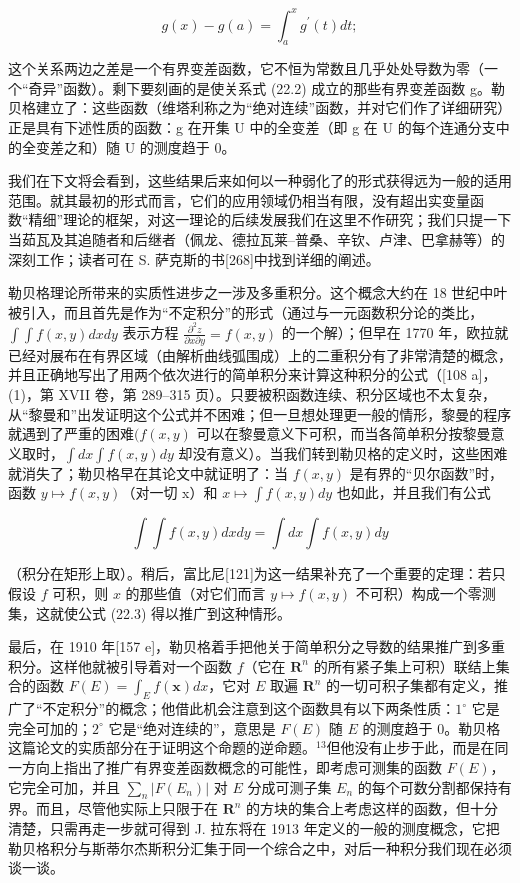 \[
g (x) - g (a) = \int_ {a} ^ {x} g ^ {\prime} (t) d t;\tag{22.2}
\]

这个关系两边之差是一个有界变差函数，它不恒为常数且几乎处处导数为零（一个“奇异”函数）。剩下要刻画的是使关系式 (22.2) 成立的那些有界变差函数 g。勒贝格建立了：这些函数（维塔利称之为“绝对连续”函数，并对它们作了详细研究）正是具有下述性质的函数：g 在开集 U 中的全变差（即 g 在 U 的每个连通分支中的全变差之和）随 U 的测度趋于 0。

我们在下文将会看到，这些结果后来如何以一种弱化了的形式获得远为一般的适用范围。就其最初的形式而言，它们的应用领域仍相当有限，没有超出实变量函数“精细”理论的框架，对这一理论的后续发展我们在这里不作研究；我们只提一下当茹瓦及其追随者和后继者（佩龙、德拉瓦莱–普桑、辛钦、卢津、巴拿赫等）的深刻工作；读者可在 S. 萨克斯的书{[}268{]}中找到详细的阐述。

勒贝格理论所带来的实质性进步之一涉及多重积分。这个概念大约在 18 世纪中叶被引入，而且首先是作为“不定积分”的形式（通过与一元函数积分论的类比，\(\int\int f(x,y)dx dy\) 表示方程 \(\frac{\partial^{2}z}{\partial x\partial y}=f(x,y)\) 的一个解）；但早在 1770 年，欧拉就已经对展布在有界区域（由解析曲线弧围成）上的二重积分有了非常清楚的概念，并且正确地写出了用两个依次进行的简单积分来计算这种积分的公式（{[}108 a{]}，(1)，第 XVII 卷，第 289–315 页）。只要被积函数连续、积分区域也不太复杂，从“黎曼和”出发证明这个公式并不困难；但一旦想处理更一般的情形，黎曼的程序就遇到了严重的困难\((f(x,y)\) 可以在黎曼意义下可积，而当各简单积分按黎曼意义取时，\(\int dx\int f(x,y)dy\) 却没有意义）。当我们转到勒贝格的定义时，这些困难就消失了；勒贝格早在其论文中就证明了：当 \(f(x,y)\) 是有界的“贝尔函数”时，函数 \(y\mapsto f(x,y)\)（对一切 x）和 \(x\mapsto\int f(x,y)dy\) 也如此，并且我们有公式

\[
\int \int f (x, y) d x d y = \int d x \int f (x, y) d y\tag{22.3}
\]

（积分在矩形上取）。稍后，富比尼{[}121{]}为这一结果补充了一个重要的定理：若只假设 \(f\) 可积，则 \(x\) 的那些值（对它们而言 \(y \mapsto f(x, y)\) 不可积）构成一个零测集，这就使公式 (22.3) 得以推广到这种情形。

最后，在 1910 年{[}157 e{]}，勒贝格着手把他关于简单积分之导数的结果推广到多重积分。这样他就被引导着对一个函数 \(f\)（它在 \(\mathbf{R}^n\) 的所有紧子集上可积）联结上集合的函数 \(F(E) = \int_E f(\mathbf{x}) dx\)，它对 \(E\) 取遍 \(\mathbf{R}^n\) 的一切可积子集都有定义，推广了“不定积分”的概念；他借此机会注意到这个函数具有以下两条性质：\(1^\circ\) 它是完全可加的；\(2^\circ\) 它是“绝对连续的”，意思是 \(F(E)\) 随 \(E\) 的测度趋于 0。勒贝格这篇论文的实质部分在于证明这个命题的逆命题。\(^{13}\)但他没有止步于此，而是在同一方向上指出了推广有界变差函数概念的可能性，即考虑可测集的函数 \(F(E)\)，它完全可加，并且 \(\sum_n |F(E_n)|\) 对 \(E\) 分成可测子集 \(E_n\) 的每个可数分割都保持有界。而且，尽管他实际上只限于在 \(\mathbf{R}^n\) 的方块的集合上考虑这样的函数，但十分清楚，只需再走一步就可得到 J. 拉东将在 1913 年定义的一般的测度概念，它把勒贝格积分与斯蒂尔杰斯积分汇集于同一个综合之中，对后一种积分我们现在必须谈一谈。

